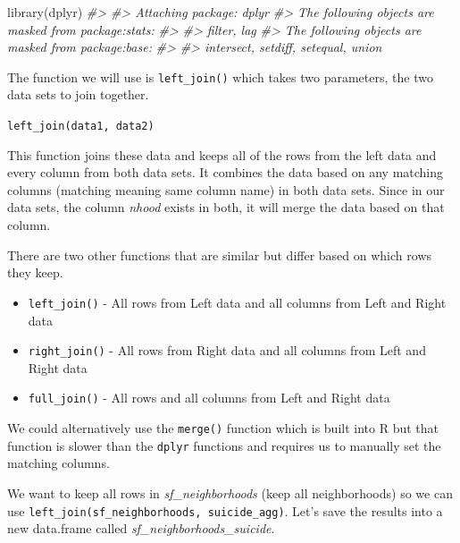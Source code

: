 \documentclass[
  12pt,
]{book}
\newenvironment{Shaded}{\begin{snugshade}}{\end{snugshade}}
\newcommand{\CommentTok}[1]{\textcolor[rgb]{0.37,0.37,0.37}{\textit{#1}}}
\newcommand{\FunctionTok}[1]{\textcolor[rgb]{0,0,0}{#1}}
\newcommand{\NormalTok}[1]{#1}
\providecommand{\tightlist}{%
  \setlength{\itemsep}{0pt}\setlength{\parskip}{0pt}}
\begin{document}
\begin{Shaded}
\begin{Highlighting}[]
\FunctionTok{library}\NormalTok{(dplyr)}
\CommentTok{\#\textgreater{} }
\CommentTok{\#\textgreater{} Attaching package: \textquotesingle{}dplyr\textquotesingle{}}
\CommentTok{\#\textgreater{} The following objects are masked from \textquotesingle{}package:stats\textquotesingle{}:}
\CommentTok{\#\textgreater{} }
\CommentTok{\#\textgreater{}     filter, lag}
\CommentTok{\#\textgreater{} The following objects are masked from \textquotesingle{}package:base\textquotesingle{}:}
\CommentTok{\#\textgreater{} }
\CommentTok{\#\textgreater{}     intersect, setdiff, setequal, union}
\end{Highlighting}
\end{Shaded}

The function we will use is \texttt{left\_join()} which takes two parameters, the two data sets to join together.

\texttt{left\_join(data1,\ data2)}

This function joins these data and keeps all of the rows from the left data and every column from both data sets. It combines the data based on any matching columns (matching meaning same column name) in both data sets. Since in our data sets, the column \emph{nhood} exists in both, it will merge the data based on that column.

There are two other functions that are similar but differ based on which rows they keep.

\begin{itemize}
\tightlist
\item
  \texttt{left\_join()} - All rows from Left data and all columns from Left and Right data
\item
  \texttt{right\_join()} - All rows from Right data and all columns from Left and Right data
\item
  \texttt{full\_join()} - All rows and all columns from Left and Right data
\end{itemize}

We could alternatively use the \texttt{merge()} function which is built into R but that function is slower than the \texttt{dplyr} functions and requires us to manually set the matching columns.

We want to keep all rows in \emph{sf\_neighborhoods} (keep all neighborhoods) so we can use \texttt{left\_join(sf\_neighborhoods,\ suicide\_agg)}. Let's save the results into a new data.frame called \emph{sf\_neighborhoods\_suicide}.
\end{document}
